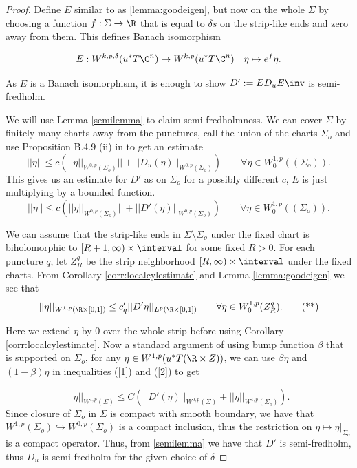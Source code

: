 \begin{proof}
Define $E$ similar to as \ref{lemma:goodeigen}, but now on the whole $\Sigma$ by choosing a function $f:\Sigma \to \R$ that is equal to $\delta s$ on the strip-like ends and zero away from them. This defines  Banach isomorphism

\begin{equation}
\label{eqn:soboleviso}
E : W^{k,p,\delta}(u^* T\C^n) \rightarrow W^{k,p}(u^* T\C^n)\quad \eta \mapsto e^f\eta.
\end{equation}

\noindent As $E$ is a Banach isomorphism, it is enough to show $D' := ED_uE\inv$ is semi-fredholm. 


\noindent We will use Lemma \ref{semilemma} to claim semi-fredholmness. We can cover $\Sigma$ by finitely many charts away from the punctures, call the union of the charts $\Sigma_o$ and use Proposition B.4.9 (ii) in \cite{jholobook} to get an estimate 
$$ ||\eta|| \leq c(||\eta||_{W^{0,p}(\Sigma_o)}|| +  ||D_u (\eta) ||_{W^{0,p}(\Sigma_o)}) \qquad  \forall \eta \in W^{1,p}_0((\Sigma_o)). $$
This gives us an estimate for $D'$ as on $\Sigma_o$ for a possibly different $c$, $E$ is just multiplying by a bounded function.\begin{equation}
    ||\eta|| \leq c(||\eta||_{W^{0,p}(\Sigma_o)}|| +  ||D' (\eta) ||_{W^{0,p}(\Sigma_o)}) \qquad  \forall \eta \in W^{1,p}_0((\Sigma_o)) \tag{*}. \label{1}
\end{equation} 

We can assume that the strip-like ends in $\Sigma \setminus \Sigma_o$ under the fixed chart is biholomorphic to $[R+1,\infty) \times \interval$  for some fixed $R>0$. For each puncture $q$, let $Z^q_R$ be the strip neighborhood $[R,\infty) \times \interval$ under the fixed charts. 
From  Corollary \ref{corr:localcylestimate} and Lemma \ref{lemma:goodeigen} we see that 
\begin{equation}
    ||\eta||_{W^{1,p}(\R \times [0,1])}\leq c_q'||D' \eta||_{L^p(\R \times [0,1])} \qquad \forall \eta \in W^{1,p}_0(Z^q_R). \tag{**} \label{2}
\end{equation}


Here we extend $\eta $ by 0 over the whole strip before using Corollary \ref{corr:localcylestimate}. 
Now a standard argument of using bump function $\beta$ that is supported on  $\Sigma_o$, for any $\eta \in W^{1,p}(u^* T(\R \times Z))$, we can use $\beta\eta$ and $(1-\beta)\eta$  in inequalities (\ref{1}) and (\ref{2}) to get 

\begin{equation*}
    || \eta||_ {W^{1,p}(\Sigma)} \leq C (||D'(\eta)||_{W^{0,p}(\Sigma)} + ||\eta ||_{W^{1,p}(\Sigma_o)}).
\end{equation*}
Since  closure of $\Sigma_o$ in $\Sigma$ is compact with smooth boundary, we have that $W^{1,p} (\Sigma_o) \hookrightarrow W^{0,p} (\Sigma_o)$ is a compact inclusion, thus the restriction on $\eta \mapsto \eta|_{\Sigma_o}$ is a compact operator. Thus, from \ref{semilemma} we have that $D'$ is semi-fredholm, thus $D_u$ is semi-fredholm for the given choice of $\delta$



\end{proof}

